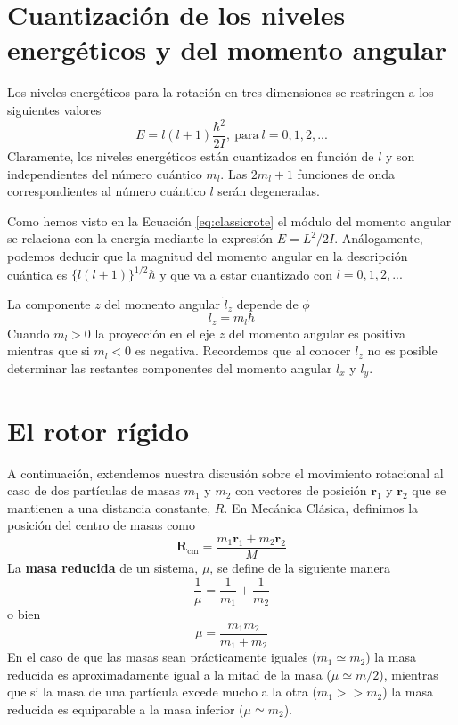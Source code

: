 \section{Cuantización de los niveles energéticos y
del momento angular}
Los niveles energéticos para la rotación en tres 
dimensiones se restringen a los siguientes valores
\begin{equation}
    E=l(l+1)\frac{\hbar^2}{2I}, 
    \mathrm{~ para~}l=0,1,2,...
\end{equation}
Claramente, los niveles energéticos están cuantizados 
en función de $l$ y son independientes del número 
cuántico $m_l$. Las $2m_l+1$ funciones de onda
correspondientes al número cuántico $l$ serán 
degeneradas.

Como hemos visto en la Ecuación \ref{eq:classicrote} el 
módulo del momento angular se relaciona con la energía
mediante la expresión $E=L^2/2I$. Análogamente, podemos
deducir que la magnitud del momento angular en la 
descripción cuántica es $\{l(l+1)\}^{1/2}\hbar$ y que va
a estar cuantizado con $l=0,1,2,...$

La componente $z$ del momento angular
$\hat{l}_z$ depende de $\phi$ \begin{equation}
    l_z=m_l\hbar
    \label{eq:lz}
\end{equation}
Cuando $m_l>0$ la proyección en el eje $z$ del momento
angular  es positiva mientras que si $m_l<0$  es negativa.
Recordemos que al conocer $l_z$ no es posible determinar 
las restantes componentes del momento angular $l_x$ y $l_y$.

\section{El rotor rígido}
A continuación, extendemos nuestra discusión sobre el 
movimiento rotacional al caso de dos partículas de masas 
$m_1$ y $m_2$ con vectores de posición $\mathbf{r}_1$ y 
$\mathbf{r}_2$ que se mantienen a una distancia constante,
$R$. En Mecánica Clásica, definimos la posición del centro
de masas como 
\begin{equation}
    \mathbf{R}_\mathrm{cm}= \frac{m_1\mathbf{r}_1+m_2\mathbf{r}_2}{M}
\end{equation}
La \textbf{masa reducida} de un sistema, $\mu$, se define
de la siguiente manera
\begin{equation}
    \frac{1}{\mu}=\frac{1}{m_1}+\frac{1}{m_2}
\end{equation}
o bien
\begin{equation}
    \mu=\frac{m_1m_2}{m_1+m_2}
\end{equation}
En el caso de que las masas sean prácticamente iguales 
($m_1\simeq m_2$) la masa reducida es aproximadamente 
igual a la mitad de la masa ($\mu\simeq m/2$), mientras
que si la masa de una partícula excede mucho a la otra
($m_1>>m_2$) la masa reducida es equiparable
a la masa inferior ($\mu\simeq m_2$).


